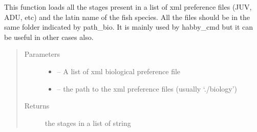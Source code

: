 \documentclass[letterpaper,10pt,english]{sphinxmanual}
\begin{document}
\begin{fulllineitems}
\label{\detokenize{index:src.bio_info.get_stage}}
This function loads all the stages present in a list of  xml preference files (JUV, ADU, etc) and the latin name of
the fish species. All the files should be in the same folder indicated by path\_bio. It is mainly used by habby\_cmd
but it can be useful in other cases also.
\begin{quote}\begin{description}
\item[{Parameters}] \leavevmode\begin{itemize}
\item {} 
 -- A list of xml biological preference file

\item {} 
 -- the path to the xml preference files (usually `./biology')

\end{itemize}

\item[{Returns}] \leavevmode
the stages in a list of string

\end{description}\end{quote}

\end{fulllineitems}

\end{document}
